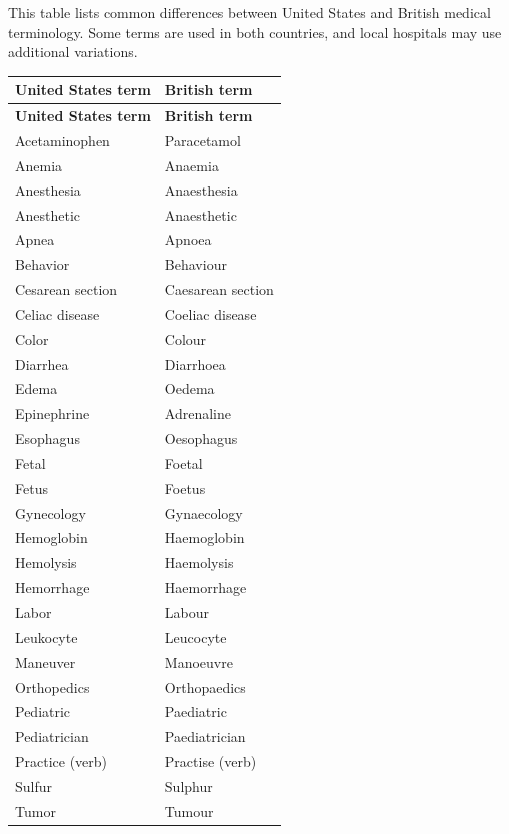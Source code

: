 This table lists common differences between United States and British medical terminology. Some terms are used in both countries, and local hospitals may use additional variations.

\small
\setlength{\LTleft}{0pt}
\setlength{\LTright}{0pt}
\begin{longtable}{>{\raggedright\arraybackslash}p{} >{\raggedright\arraybackslash}p{}}
\toprule
\textbf{United States term} & \textbf{British term} \\
\midrule
\endfirsthead
\toprule
\textbf{United States term} & \textbf{British term} \\
\midrule
\endhead
\bottomrule
\endfoot

Acetaminophen & Paracetamol \\
Anemia & Anaemia \\
Anesthesia & Anaesthesia \\
Anesthetic & Anaesthetic \\
Apnea & Apnoea \\
Behavior & Behaviour \\
Cesarean section & Caesarean section \\
Celiac disease & Coeliac disease \\
Color & Colour \\
Diarrhea & Diarrhoea \\
Edema & Oedema \\
Epinephrine & Adrenaline \\
Esophagus & Oesophagus \\
Fetal & Foetal \\
Fetus & Foetus \\
Gynecology & Gynaecology \\
Hemoglobin & Haemoglobin \\
Hemolysis & Haemolysis \\
Hemorrhage & Haemorrhage \\
Labor & Labour \\
Leukocyte & Leucocyte \\
Maneuver & Manoeuvre \\
Orthopedics & Orthopaedics \\
Pediatric & Paediatric \\
Pediatrician & Paediatrician \\
Practice (verb) & Practise (verb) \\
Sulfur & Sulphur \\
Tumor & Tumour \\

\end{longtable}

